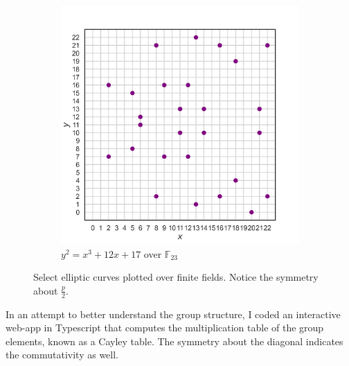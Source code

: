 \documentclass[11pt, a4paper]{report}
\newcommand{\field}{\mathbb{F}}
\begin{document}
\begin{figure}[ht]
\begin{subfigure}{0.49\textwidth}
\includegraphics[width = \textwidth]{krationalpoints23.png}
\caption{$y^2 = x^3 + 12x + 17$ over $\field_{23}$}
\label{fig:right}
\end{subfigure}
\caption{Select elliptic curves plotted over finite fields. Notice the symmetry about $\frac{p}{2}$.}
\label{fig:combined}
\end{figure}

In an attempt to better understand the group structure, I coded an interactive web-app in Typescript that computes the multiplication table of the group elements, known as a Cayley table. The symmetry about the diagonal indicates the commutativity as well.
\end{document}
